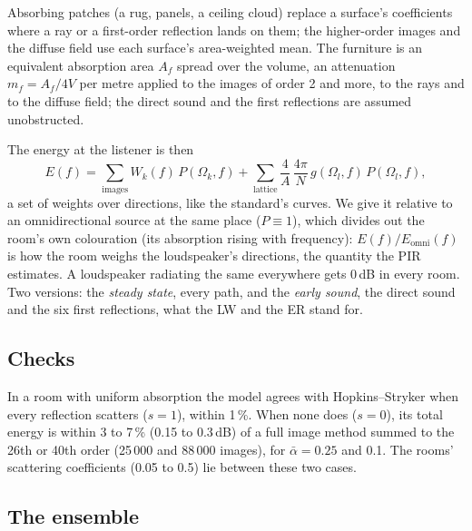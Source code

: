 \documentclass[11pt,a4paper]{article}
\begin{document}
Absorbing patches (a rug, panels, a ceiling cloud) replace a surface's coefficients where a ray or a
first-order reflection lands on them; the higher-order images and the diffuse field use each
surface's area-weighted mean. The furniture is an equivalent absorption area $A_f$ spread over the
volume, an attenuation $m_f = A_f / 4V$ per metre applied to the images of order 2 and more, to the rays
and to the diffuse field; the direct sound and the first reflections are assumed unobstructed.

The energy at the listener is then
\begin{equation}
E(f) = \sum_{\text{images}} W_k(f)\,P(\Omega_k, f) + \sum_{\text{lattice}} \frac{4}{A}\,\frac{4\pi}{N}\,g(\Omega_l, f)\,P(\Omega_l, f),
\end{equation}
a set of weights over directions, like the standard's curves. We give it relative to an
omnidirectional source at the same place ($P \equiv 1$), which divides out the room's own colouration
(its absorption rising with frequency): $E(f) / E_{\mathrm{omni}}(f)$ is how the room weighs the
loudspeaker's directions, the quantity the PIR estimates. A loudspeaker radiating the same everywhere
gets 0\,dB in every room. Two versions: the \emph{steady state}, every path, and the \emph{early
sound}, the direct sound and the six first reflections, what the LW and the ER stand for.

\subsection{Checks}

In a room with uniform absorption the model agrees with Hopkins--Stryker when every reflection
scatters ($s = 1$), within 1\,\%. When none does ($s = 0$), its total energy is within 3 to 7\,\%
(0.15 to 0.3\,dB) of a full image method summed to the 26th or 40th order (25\,000 and 88\,000
images), for $\bar\alpha = 0.25$ and 0.1. The rooms' scattering coefficients (0.05 to 0.5) lie
between these two cases.

\subsection{The ensemble}
\end{document}
